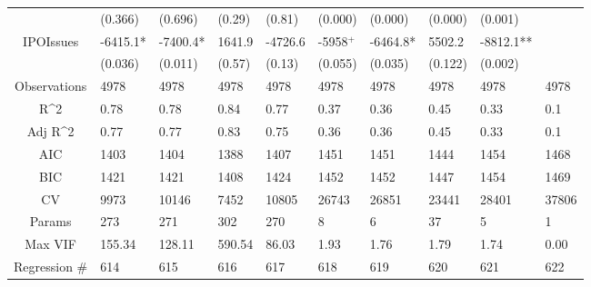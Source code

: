 \documentclass{article}
\begin{document}
\begin{table}[H]
\begin{tabular}{|clllllllll|}
   & (0.366) & (0.696) & (0.29) & (0.81) & (0.000) & (0.000) & (0.000) & (0.001) &  \\ 
  IPOIssues & -6415.1* & -7400.4* & 1641.9 & -4726.6 & -5958$^{+}$ & -6464.8* & 5502.2 & -8812.1** &  \\ 
   & (0.036) & (0.011) & (0.57) & (0.13) & (0.055) & (0.035) & (0.122) & (0.002) &  \\ 
  \hline 
 Observations & 4978 & 4978 & 4978 & 4978 & 4978 & 4978 & 4978 & 4978 & 4978 \\ 
  R^2 & 0.78 & 0.78 & 0.84 & 0.77 & 0.37 & 0.36 & 0.45 & 0.33 & 0.1 \\ 
  Adj R^2 & 0.77 & 0.77 & 0.83 & 0.75 & 0.36 & 0.36 & 0.45 & 0.33 & 0.1 \\ 
  AIC & 1403 & 1404 & 1388 & 1407 & 1451 & 1451 & 1444 & 1454 & 1468 \\ 
  BIC & 1421 & 1421 & 1408 & 1424 & 1452 & 1452 & 1447 & 1454 & 1469 \\ 
  CV & 9973 & 10146 & 7452 & 10805 & 26743 & 26851 & 23441 & 28401 & 37806 \\ 
  Params & 273 & 271 & 302 & 270 & 8 & 6 & 37 & 5 & 1 \\ 
  Max VIF & 155.34 & 128.11 & 590.54 & 86.03 & 1.93 & 1.76 & 1.79 & 1.74 & 0.00 \\ 
  Regression \# & 614 & 615 & 616 & 617 & 618 & 619 & 620 & 621 & 622 \\ 
   \hline
\end{tabular}
 
\end{table}
\end{document}
